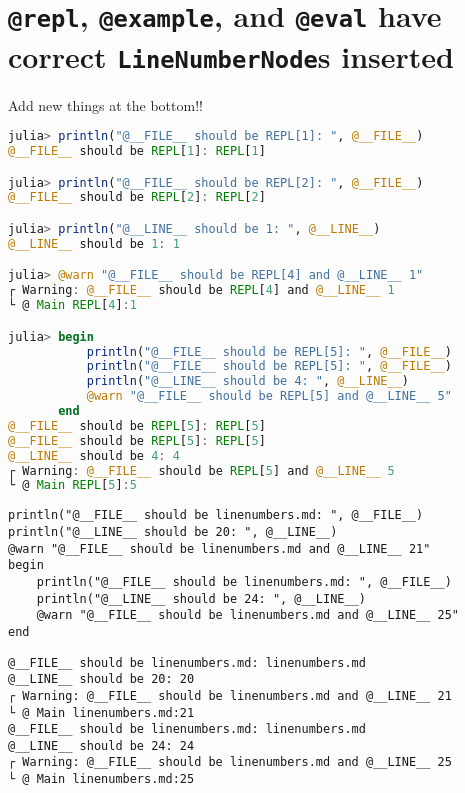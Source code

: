\chapter{\texttt{@repl}, \texttt{@example}, and \texttt{@eval} have correct \texttt{LineNumberNode}s inserted}



\label{14177920617661754068}{}


Add new things at the bottom!!




\begin{lstlisting}[language=julia, style=jlcodestyle]
julia> println("@__FILE__ should be REPL[1]: ", @__FILE__)
@__FILE__ should be REPL[1]: REPL[1]

julia> println("@__FILE__ should be REPL[2]: ", @__FILE__)
@__FILE__ should be REPL[2]: REPL[2]

julia> println("@__LINE__ should be 1: ", @__LINE__)
@__LINE__ should be 1: 1

julia> @warn "@__FILE__ should be REPL[4] and @__LINE__ 1"
┌ Warning: @__FILE__ should be REPL[4] and @__LINE__ 1
└ @ Main REPL[4]:1

julia> begin
           println("@__FILE__ should be REPL[5]: ", @__FILE__)
           println("@__FILE__ should be REPL[5]: ", @__FILE__)
           println("@__LINE__ should be 4: ", @__LINE__)
           @warn "@__FILE__ should be REPL[5] and @__LINE__ 5"
       end
@__FILE__ should be REPL[5]: REPL[5]
@__FILE__ should be REPL[5]: REPL[5]
@__LINE__ should be 4: 4
┌ Warning: @__FILE__ should be REPL[5] and @__LINE__ 5
└ @ Main REPL[5]:5
\end{lstlisting}




\begin{lstlisting}[]
println("@__FILE__ should be linenumbers.md: ", @__FILE__)
println("@__LINE__ should be 20: ", @__LINE__)
@warn "@__FILE__ should be linenumbers.md and @__LINE__ 21"
begin
    println("@__FILE__ should be linenumbers.md: ", @__FILE__)
    println("@__LINE__ should be 24: ", @__LINE__)
    @warn "@__FILE__ should be linenumbers.md and @__LINE__ 25"
end
\end{lstlisting}


\begin{lstlisting}[]
@__FILE__ should be linenumbers.md: linenumbers.md
@__LINE__ should be 20: 20
┌ Warning: @__FILE__ should be linenumbers.md and @__LINE__ 21
└ @ Main linenumbers.md:21
@__FILE__ should be linenumbers.md: linenumbers.md
@__LINE__ should be 24: 24
┌ Warning: @__FILE__ should be linenumbers.md and @__LINE__ 25
└ @ Main linenumbers.md:25
\end{lstlisting}




